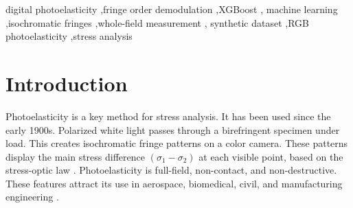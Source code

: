\documentclass[review,12pt]{elsarticle}
\begin{document}
\begin{frontmatter}
\begin{abstract}
The model,trained on a  ${>}70$~GB memory chunked dataset which contains physics-simulated fringe patterns (representing analytical Kirsch, Timoshenko, and Euler-Bernoulli solutions rendered through five distinct illuminant SPDs and two camera sensor models) and geometrically augmented data from seven real specimen categories. Each pixel is characterized by a 27-dimensional feature vector that captures local colour statistics, HSV representations, bi-lateral and mean filter context, spatial Sobel gradients, Laplacians and dual-scale Gabor Filter responses. A fringe-order balance sampling strategy that divides the 0 to 1 fractional range into 10 equal bins with a ceiling of 2,000 samples per bin per image was employed to prevent dominance of low-order fringes during the training. Experimental validation shows a strong predictive accuracy on unseen test geometries, showing significant resilience to lighting gradients and camera sensor variation. This XGBoost framework provides a calibration-free, illumination independant tool that can be deployed across arbitrary geometries without retraining leading way to rapid industrial stress analysis. 

\end{abstract}

\begin{keyword}
digital photoelasticity \sep fringe order demodulation \sep XGBoost \sep
machine learning \sep isochromatic fringes \sep whole-field measurement \sep
synthetic dataset \sep RGB photoelasticity \sep stress analysis
\end{keyword}

\end{frontmatter}

\section{Introduction}
\label{sec:intro}
Photoelasticity is a key method for stress analysis. It has been used since the early 1900s.
Polarized white light passes through a birefringent specimen under load.
This creates isochromatic fringe patterns on a color camera.
These patterns display the main stress difference $(\sigma_1 - \sigma_2)$ at each visible point, based on the stress-optic law \cite{dally1991}.
Photoelasticity is full-field, non-contact, and non-destructive.
These features attract its use in aerospace, biomedical, civil, and manufacturing engineering \cite{ramesh2015,patterson2002}.
\end{document}
